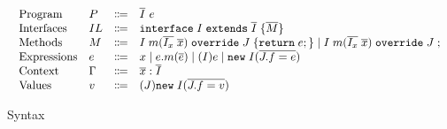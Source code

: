\begin{figure*}
	\saveSpaceFig
	\begin{displaymath}
		\begin{array}{l}
			\begin{array}{llrl}
				\text{Program}		& P & \Coloneqq  & \overline{I} \ e \\
				\text{Interfaces}   & IL & \Coloneqq & \texttt{interface} \; I \; \texttt{extends} \; \overline{I} \; {\{} \overline{M} {\}} \\
				\text{Methods}      & M  & \Coloneqq & I \; m (\overline{I_x} \; \overline{x}) \; \texttt{override} \; J \; {\{} \texttt{return} \; e ; {\}}  \mid
				I \; m (\overline{I_x} \; \overline{x}) \; \texttt{override} \; J \; ; \\
				\text{Expressions}  & e  & \Coloneqq & 
				x \mid
				e.m(\overline{e}) \mid
				(I)e \mid 
				\texttt{new} \; I(\overline{J.f=e}) \\
				\text{Context}      & \Gamma & \Coloneqq & \overline{x}:\overline{I} \\
				\text{Values}       & v & \Coloneqq & (J) \texttt{new} \; I(\overline{J.f=v}) \\
			\end{array}
		\end{array}
	\end{displaymath}
	\caption{Syntax}\label{fig:syntax}
	\saveSpaceFig
\end{figure*}

%		
	

